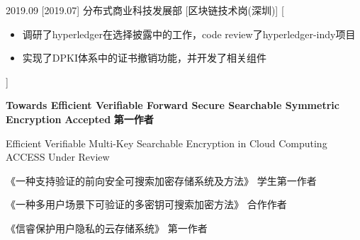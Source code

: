 \documentclass[zh]{resume}
\begin{document}
\begin{experiences}
  \experience
    {2019.09}%
    [2019.07]%
    {}%
    {分布式商业科技发展部}%
    [区块链技术岗(深圳)]%
    [\begin{itemize}
      \item{\icon{\faFlag}} 调研了hyperledger在选择披露中的工作，code review了hyperledger-indy项目
      \item{\icon{\faFlag}} 实现了DPKI体系中的证书撤销功能，并开发了相关组件 
    \end{itemize}]%

\end{experiences}


\begin{myresearchs}
  \myresearch
    {\textbf{Towards Efficient Verifiable Forward Secure Searchable Symmetric Encryption}}
    {\textbf{}}
    {\textbf{Accepted}}
    {\textbf{第一作者}}%

  \myresearch
    {Efficient Verifiable Multi-Key Searchable Encryption in Cloud Computing}
    {ACCESS}
    {Under Review}
    { }

  \myzhuanli
    {《一种支持验证的前向安全可搜索加密存储系统及方法》}
    {学生第一作者}

  \myzhuanli
    {《一种多用户场景下可验证的多密钥可搜索加密方法》}
    {合作作者}

  \myruanzhu
    {《信睿保护用户隐私的云存储系统》}
    {第一作者}

\end{myresearchs}
\end{document}
